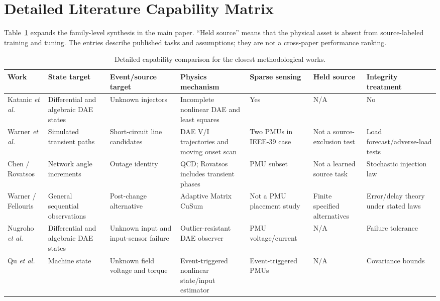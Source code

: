\documentclass{ieeeaccess}
\begin{document}


\section{Detailed Literature Capability Matrix}

Table~\ref{tab:supp-literature} expands the family-level synthesis in the main paper. ``Held source'' means that the physical asset is absent from source-labeled training and tuning. The entries describe published tasks and assumptions; they are not a cross-paper performance ranking.

\begin{table}[t]
\caption{Detailed capability comparison for the closest methodological works.}
\label{tab:supp-literature}
\centering
\scriptsize
\begin{tabularx}{\textwidth}{@{}lXXXXXX@{}}
\toprule
Work & State target & Event/source target & Physics mechanism & Sparse sensing & Held source & Integrity treatment \\
\midrule
Katanic \emph{et al.} \cite{katanic2024recursive} & Differential and algebraic DAE states & Unknown injectors & Incomplete nonlinear DAE and least squares & Yes & N/A & No \\
Warner \emph{et al.} \cite{warner2023highfidelity} & Simulated transient paths & Short-circuit line candidates & DAE V/I trajectories and moving onset scan & Two PMUs in IEEE-39 case & Not a source-exclusion test & Load forecast/adverse-load tests \\
Chen / Rovatsos \cite{chen2016quickest,rovatsos2017outage} & Network angle increments & Outage identity & QCD; Rovatsos includes transient phases & PMU subset & Not a learned source task & Stochastic injection law \\
Warner / Fellouris \cite{warner2024matrix} & General sequential observations & Post-change alternative & Adaptive Matrix CuSum & Not a PMU placement study & Finite specified alternatives & Error/delay theory under stated laws \\
Nugroho \emph{et al.} \cite{nugroho2022dae} & Differential and algebraic DAE states & Unknown input and input-sensor failure & Outlier-resistant DAE observer & PMU voltage/current & N/A & Failure tolerance \\
Qu \emph{et al.} \cite{qu2023joint} & Machine state & Unknown field voltage and torque & Event-triggered nonlinear state/input estimator & Event-triggered PMUs & N/A & Covariance bounds \\

\end{tabularx}
\end{table}
\end{document}
